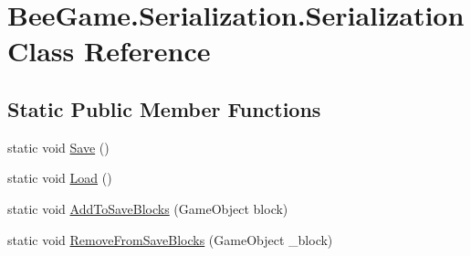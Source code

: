 \hypertarget{class_bee_game_1_1_serialization_1_1_serialization}{}\section{Bee\+Game.\+Serialization.\+Serialization Class Reference}
\label{class_bee_game_1_1_serialization_1_1_serialization}
\subsection*{Static Public Member Functions}
\begin{DoxyCompactItemize}
\item 
static void \hyperlink{class_bee_game_1_1_serialization_1_1_serialization_ac1a39ee414803d84d970c1d6c03facbc}{Save} ()
\item 
static void \hyperlink{class_bee_game_1_1_serialization_1_1_serialization_a08f39770d6cc2b4a86fd7d7f00ff56a7}{Load} ()
\item 
static void \hyperlink{class_bee_game_1_1_serialization_1_1_serialization_a1cc1b4dcf2acafaa063b5fde22a0dd41}{Add\+To\+Save\+Blocks} (Game\+Object block)
\item 
static void \hyperlink{class_bee_game_1_1_serialization_1_1_serialization_a248f000bbdc4c3dad2f03018d63fbb9f}{Remove\+From\+Save\+Blocks} (Game\+Object \+\_\+block)
\end{DoxyCompactItemize}
